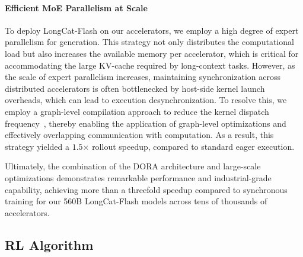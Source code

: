 \paragraph{Efficient MoE Parallelism at Scale}

To deploy LongCat-Flash on our accelerators, we employ a high degree of expert parallelism for generation. 
This strategy not only distributes the computational load but also increases the available memory per accelerator, which is critical for accommodating the large KV-cache required by long-context tasks. 
However, as the scale of expert parallelism increases, maintaining synchronization across distributed accelerators is often bottlenecked by host-side kernel launch overheads, which can lead to execution desynchronization. 
To resolve this, we employ a graph-level compilation approach to reduce the kernel dispatch frequency~\citep{ansel2024pytorch}, thereby enabling the application of graph-level optimizations and effectively overlapping communication with computation. 
As a result, this strategy yielded a $1.5$× rollout speedup, compared to standard eager execution.

Ultimately, the combination of the DORA architecture and large-scale optimizations demonstrates remarkable performance and industrial-grade capability, achieving more than a threefold speedup compared to synchronous training for our 560B LongCat-Flash models across tens of thousands of accelerators.


\subsection{RL Algorithm}

